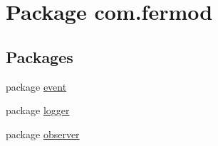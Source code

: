 \hypertarget{namespacecom_1_1fermod}{}\section{Package com.\+fermod}
\label{namespacecom_1_1fermod}
\subsection*{Packages}
\begin{DoxyCompactItemize}
\item 
package \mbox{\hyperlink{namespacecom_1_1fermod_1_1event}{event}}
\item 
package \mbox{\hyperlink{namespacecom_1_1fermod_1_1logger}{logger}}
\item 
package \mbox{\hyperlink{namespacecom_1_1fermod_1_1observer}{observer}}
\end{DoxyCompactItemize}
